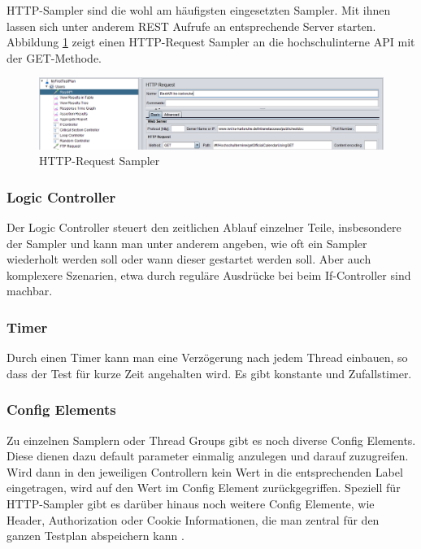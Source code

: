 \documentclass[a4paper,12pt]{article}
\begin{document}
HTTP-Sampler sind die wohl am häufigsten eingesetzten Sampler. Mit ihnen lassen sich unter anderem REST Aufrufe an entsprechende Server starten. Abbildung \ref{fig:http_request_sampler} zeigt einen HTTP-Request Sampler an die hochschulinterne API mit der GET-Methode.

\begin{figure}[htb]%
 \centering
    \includegraphics[width=1\textwidth]{bilder/http_request_sampler.png}
  \caption{HTTP-Request Sampler}
  \label{fig:http_request_sampler}
\end{figure}

\subsubsection{Logic Controller}
Der Logic Controller steuert den zeitlichen Ablauf einzelner Teile, insbesondere der Sampler und kann man unter anderem angeben, wie oft ein Sampler wiederholt werden soll oder wann dieser gestartet werden soll. Aber auch komplexere Szenarien, etwa durch reguläre Ausdrücke bei beim If-Controller sind machbar.

\subsubsection{Timer}
Durch einen Timer kann man eine Verzögerung nach jedem Thread einbauen, so dass der Test für kurze Zeit angehalten wird. Es gibt konstante und Zufallstimer.

\subsubsection{Config Elements}
Zu einzelnen Samplern oder Thread Groups gibt es noch diverse Config Elements. Diese dienen dazu default parameter einmalig anzulegen und darauf zuzugreifen. Wird dann in den jeweiligen Controllern kein Wert in die entsprechenden Label eingetragen, wird auf den Wert im Config Element zurückgegriffen. Speziell für HTTP-Sampler gibt es darüber hinaus noch weitere Config Elemente, wie Header, Authorization oder Cookie Informationen, die man zentral für den ganzen Testplan abspeichern kann \cite{online:performanceTools}.
\end{document}
